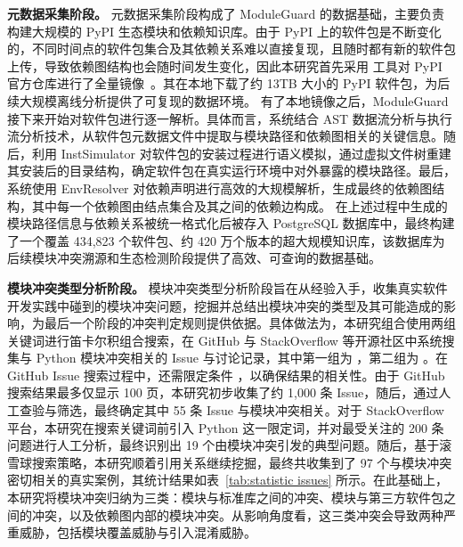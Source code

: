 

\textbf{元数据采集阶段。}
元数据采集阶段构成了 ModuleGuard 的数据基础，主要负责构建大规模的 PyPI 生态模块和依赖知识库。由于 PyPI 上的软件包是不断变化的，不同时间点的软件包集合及其依赖关系难以直接复现，且随时都有新的软件包上传，导致依赖图结构也会随时间发生变化，因此本研究首先采用  工具对 PyPI 官方仓库进行了全量镜像~\cite{bandersnatch}。其在本地下载了约 13TB 大小的 PyPI 软件包，为后续大规模离线分析提供了可复现的数据环境。
有了本地镜像之后，ModuleGuard 接下来开始对软件包进行逐一解析。具体而言，系统结合 AST 数据流分析与执行流分析技术，从软件包元数据文件中提取与模块路径和依赖图相关的关键信息。随后，利用 InstSimulator 对软件包的安装过程进行语义模拟，通过虚拟文件树重建其安装后的目录结构，确定软件包在真实运行环境中对外暴露的模块路径。最后，系统使用 EnvResolver 对依赖声明进行高效的大规模解析，生成最终的依赖图结构，其中每一个依赖图由结点集合及其之间的依赖边构成。
在上述过程中生成的模块路径信息与依赖关系被统一格式化后被存入 PostgreSQL 数据库中，最终构建了一个覆盖 434,823 个软件包、约 420 万个版本的超大规模知识库，该数据库为后续模块冲突溯源和生态检测阶段提供了高效、可查询的数据基础。

\textbf{模块冲突类型分析阶段。}
模块冲突类型分析阶段旨在从经验入手，收集真实软件开发实践中碰到的模块冲突问题，挖掘并总结出模块冲突的类型及其可能造成的影响，为最后一个阶段的冲突判定规则提供依据。具体做法为，本研究组合使用两组关键词进行笛卡尔积组合搜索，在 GitHub 与 StackOverflow 等开源社区中系统搜集与 Python 模块冲突相关的 Issue 与讨论记录，其中第一组为 ，第二组为 。在 GitHub Issue 搜索过程中，还需限定条件 ，以确保结果的相关性。由于 GitHub 搜索结果最多仅显示 100 页，本研究初步收集了约 1,000 条 Issue，随后，通过人工查验与筛选，最终确定其中 55 条 Issue 与模块冲突相关。对于 StackOverflow 平台，本研究在搜索关键词前引入 Python 这一限定词，并对最受关注的 200 条问题进行人工分析，最终识别出 19 个由模块冲突引发的典型问题。随后，基于滚雪球搜索策略，本研究顺着引用关系继续挖掘，最终共收集到了 97 个与模块冲突密切相关的真实案例，其统计结果如表~\ref{tab:statistic issues} 所示。在此基础上，本研究将模块冲突归纳为三类：模块与标准库之间的冲突、模块与第三方软件包之间的冲突，以及依赖图内部的模块冲突。从影响角度看，这三类冲突会导致两种严重威胁，包括模块覆盖威胁与引入混淆威胁。

